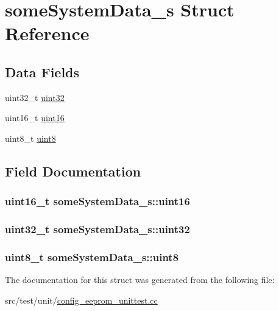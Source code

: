 \hypertarget{structsomeSystemData__s}{\section{some\+System\+Data\+\_\+s Struct Reference}
\label{structsomeSystemData__s}
}
\subsection*{Data Fields}
\begin{DoxyCompactItemize}
\item 
uint32\+\_\+t \hyperlink{structsomeSystemData__s_a1c40b9cbe019d2633ec5dae535091162}{uint32}
\item 
uint16\+\_\+t \hyperlink{structsomeSystemData__s_a34aadd459d67e35061f4312f66a019d9}{uint16}
\item 
uint8\+\_\+t \hyperlink{structsomeSystemData__s_a0faf70802cc80af25164348184ff7c9e}{uint8}
\end{DoxyCompactItemize}


\subsection{Field Documentation}
\hypertarget{structsomeSystemData__s_a34aadd459d67e35061f4312f66a019d9}{
\subsubsection[{uint16}]{\setlength{\rightskip}{0pt plus 5cm}uint16\+\_\+t some\+System\+Data\+\_\+s\+::uint16}}\label{structsomeSystemData__s_a34aadd459d67e35061f4312f66a019d9}
\hypertarget{structsomeSystemData__s_a1c40b9cbe019d2633ec5dae535091162}{
\subsubsection[{uint32}]{\setlength{\rightskip}{0pt plus 5cm}uint32\+\_\+t some\+System\+Data\+\_\+s\+::uint32}}\label{structsomeSystemData__s_a1c40b9cbe019d2633ec5dae535091162}
\hypertarget{structsomeSystemData__s_a0faf70802cc80af25164348184ff7c9e}{
\subsubsection[{uint8}]{\setlength{\rightskip}{0pt plus 5cm}uint8\+\_\+t some\+System\+Data\+\_\+s\+::uint8}}\label{structsomeSystemData__s_a0faf70802cc80af25164348184ff7c9e}


The documentation for this struct was generated from the following file\+:\begin{DoxyCompactItemize}
\item 
src/test/unit/\hyperlink{config__eeprom__unittest_8cc}{config\+\_\+eeprom\+\_\+unittest.\+cc}\end{DoxyCompactItemize}
